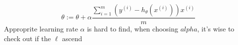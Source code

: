 \begin{answer}
    $$
    \theta:=\theta + \alpha\frac{\sum_{i=1}^m (y^{(i)} - h_\theta(x^{(i)}))x^{(i)}}{m}
    $$
    Approprite learning rate $\alpha$ is hard to find, when choosing $alpha$, it's wise to check out if the $\ell$ ascend
\end{answer}
